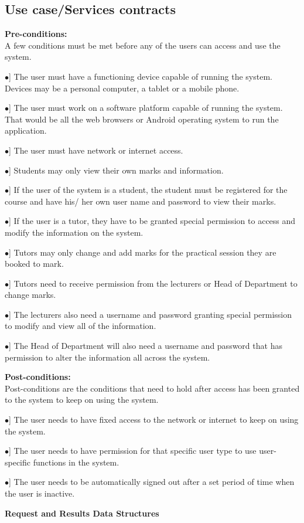 \documentclass[12pt, a4paper]{scrartcl}
\newcommand{\tab}[1]{\hspace{.05\textwidth}\rlap{#1}}
\begin{document}
			\subsection{Use case/Services contracts}
				\textbf{Pre-conditions:}\\
				A few conditions must be met before any of the users can access and use the system.
				\begin{description}
					\item \tab [$\bullet$] The user must have a functioning device capable of running the system. Devices may be a personal computer, a tablet or a mobile phone.
					\item \tab [$\bullet$] The user must work on a software platform capable of running the system. That would be all the web browsers or Android operating system to run the application.
					\item \tab [$\bullet$] The user must have network or internet access.
					\item \tab [$\bullet$] Students may only view their own marks and information.
					\item \tab [$\bullet$] If the user of the system is a student, the student must be registered for the course and have his/ her own user name and password to view their marks.
					\item \tab [$\bullet$] If the user is a tutor, they have to be granted special permission to access and modify the information on the system.
					\item \tab [$\bullet$] Tutors may only change and add marks for the practical session they are booked to mark.
					\item \tab [$\bullet$] Tutors need to receive permission from the lecturers or Head of Department to change marks.
					\item \tab [$\bullet$] The lecturers also need a username and password granting special permission to modify and view all of the information.
					\item \tab [$\bullet$] The Head of Department will also need a username and password that has permission to alter the information all across the system.
				\end{description}
				\textbf{Post-conditions:}\\
				Post-conditions are the conditions that need to hold after access has been granted to the system to keep on using the system.
				\begin{description}
					\item \tab [$\bullet$] The user needs to have fixed access to the network or internet to keep on using the system.
					\item \tab [$\bullet$] The user needs to have permission for that specific user type to use user-specific functions in the system.
					\item \tab [$\bullet$] The user needs to be automatically signed out after a set period of time when the user is inactive. 
				\end{description}
				\textbf{Request and Results Data Structures}
\end{document}
